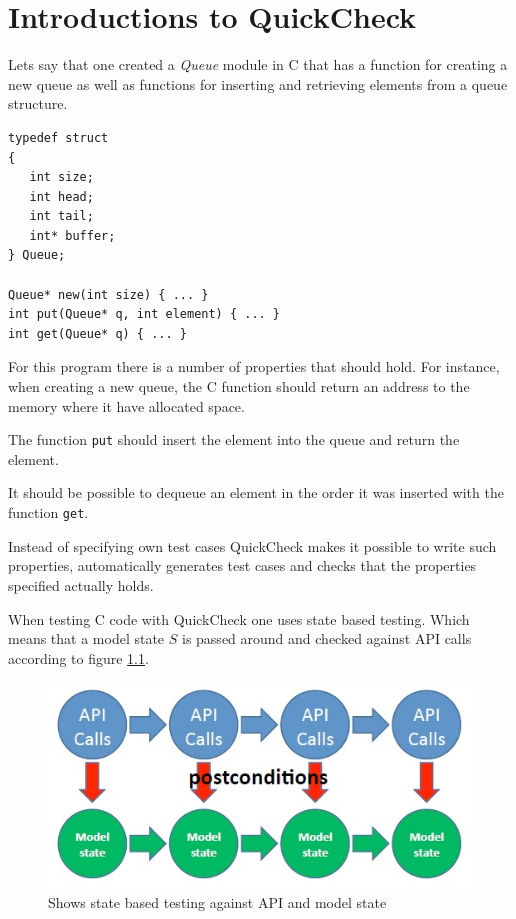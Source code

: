 \chapter{Introductions to QuickCheck}
\label{APP:QUICKCHECK}
\lstset{style=erlang}
\label{SEC:QuickCheckIntro}
Lets say that one created a \emph{Queue} module in C that has a
function for creating a new queue as well as functions for inserting and retrieving elements from a queue structure.

\begin{lstlisting}[style=c]
typedef struct
{
   int size;
   int head;
   int tail;
   int* buffer;
} Queue;

Queue* new(int size) { ... }
int put(Queue* q, int element) { ... }
int get(Queue* q) { ... }
\end{lstlisting}

For this program there is a number of properties that should hold. For
instance, when creating a new queue, the C function should return an
address to the memory where it have allocated space.

The function \lstinline!put! should insert the element into the queue
and return the element.

It should be possible to dequeue an element in the order it was
inserted with the function \lstinline!get!.

Instead of specifying own test cases QuickCheck makes it possible to
write such properties, automatically generates test cases and checks
that the properties specified actually holds.

When testing C code with QuickCheck one uses state based
testing. Which means that a model state $S$ is passed around and
checked against API calls according to figure \ref{FIG:API_CALLS}.

\begin{figure}[!h]
  \includegraphics{pictures/api_calls.jpg}
  \caption{Shows state based testing against API and model state}
  \label{FIG:API_CALLS}
\end{figure}

